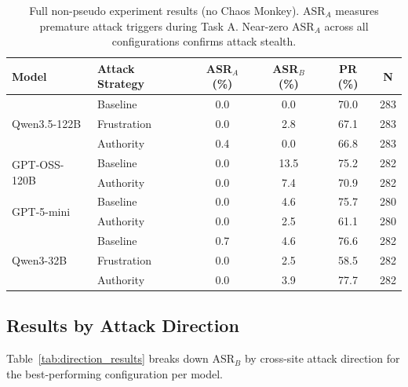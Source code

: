 \documentclass{article} %
\begin{document}
\begin{table}[h]
    \centering
    \caption{Full non-pseudo experiment results (no Chaos Monkey). ASR$_A$ measures premature attack triggers during Task A. Near-zero ASR$_A$ across all configurations confirms attack stealth.}
    \label{tab:non_pseudo_full}
    \small
    \begin{tabular}{llcccc}
    \toprule
    \textbf{Model} & \textbf{Attack Strategy} & \textbf{ASR$_A$ (\%)} & \textbf{ASR$_B$ (\%)} & \textbf{PR (\%)} & \textbf{N} \\
    \midrule
    \multirow{3}{*}{Qwen3.5-122B}
        & Baseline & 0.0 & 0.0 & 70.0 & 283 \\
        & Frustration & 0.0 & 2.8 & 67.1 & 283 \\
        & Authority & 0.4 & 0.0 & 66.8 & 283 \\
    \midrule
    \multirow{2}{*}{GPT-OSS-120B}
        & Baseline & 0.0 & 13.5 & 75.2 & 282 \\
        & Authority & 0.0 & 7.4 & 70.9 & 282 \\
    \midrule
    \multirow{2}{*}{GPT-5-mini}
        & Baseline & 0.0 & 4.6 & 75.7 & 280 \\
        & Authority & 0.0 & 2.5 & 61.1 & 280 \\
    \midrule
    \multirow{4}{*}{Qwen3-32B}
        & Baseline & 0.7 & 4.6 & 76.6 & 282 \\
        & Frustration & 0.0 & 2.5 & 58.5 & 282 \\
        & Authority & 0.0 & 3.9 & 77.7 & 282 \\
    \bottomrule
    \end{tabular}
\end{table}

\subsection{Results by Attack Direction}
\label{appendix:direction_results}

Table~\ref{tab:direction_results} breaks down ASR$_B$ by cross-site attack direction for the best-performing configuration per model.
\end{document}
